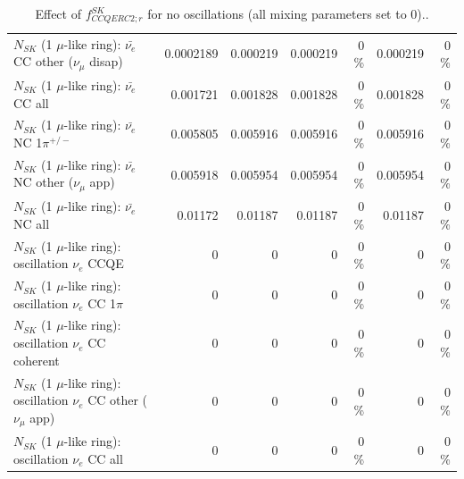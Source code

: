 \begin{table}
\begin{tabular}{| l | r | r | r  r | r  r |}
          $N_{SK}$ (1 $\mu$-like ring): $\bar{\nu_e}$ CC other ($\nu_\mu$ disap) &       0.0002189 &        0.000219 &        0.000219 &        0 \%  &        0.000219 &        0 \%  \\ 
                            $N_{SK}$ (1 $\mu$-like ring): $\bar{\nu_{e}}$ CC all &        0.001721 &        0.001828 &        0.001828 &        0 \%  &        0.001828 &        0 \%  \\ 
\hline
                     $N_{SK}$ (1 $\mu$-like ring): $\bar{\nu_e}$ NC 1$\pi^{+/-}$ &        0.005805 &        0.005916 &        0.005916 &        0 \%  &        0.005916 &        0 \%  \\ 
            $N_{SK}$ (1 $\mu$-like ring): $\bar{\nu_e}$ NC other ($\nu_\mu$ app) &        0.005918 &        0.005954 &        0.005954 &        0 \%  &        0.005954 &        0 \%  \\ 
                            $N_{SK}$ (1 $\mu$-like ring): $\bar{\nu_{e}}$ NC all &         0.01172 &         0.01187 &         0.01187 &        0 \%  &         0.01187 &        0 \%  \\ 
\hline
\hline
\hline
                          $N_{SK}$ (1 $\mu$-like ring): oscillation $\nu_e$ CCQE &               0 &               0 &               0 &        0 \%  &               0 &        0 \%  \\ 
                     $N_{SK}$ (1 $\mu$-like ring): oscillation $\nu_e$ CC 1$\pi$ &               0 &               0 &               0 &        0 \%  &               0 &        0 \%  \\ 
                   $N_{SK}$ (1 $\mu$-like ring): oscillation $\nu_e$ CC coherent &               0 &               0 &               0 &        0 \%  &               0 &        0 \%  \\ 
      $N_{SK}$ (1 $\mu$-like ring): oscillation $\nu_e$ CC other ($\nu_\mu$ app) &               0 &               0 &               0 &        0 \%  &               0 &        0 \%  \\ 
                       $N_{SK}$ (1 $\mu$-like ring): oscillation $\nu_e$  CC all &               0 &               0 &               0 &        0 \%  &               0 &        0 \%  \\ 
\hline
\hline
\end{tabular}
\caption{ Effect of $f_{CCQERC2; r}^{SK}$ for no oscillations (all mixing parameters set to 0).. }
\label{tab:num_sk_1Rmu_ccqe_ring_counting_eff_2_1RmuT_3f_osc_t13:0_spectralreco_spectraltrue}
\end{table}
